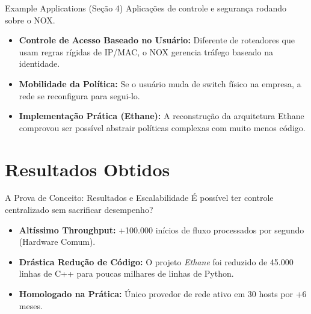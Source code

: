 \documentclass[aspectratio=169,xcolor=dvipsnames]{beamer}
\begin{document}
\begin{frame}{Example Applications (Seção 4)}
    Aplicações de controle e segurança rodando sobre o NOX.
    
    \vspace{0.5cm}
    
    \begin{itemize}            
        \item \textbf{Controle de Acesso Baseado no Usuário:} Diferente de roteadores que usam regras rígidas de IP/MAC, o NOX gerencia tráfego baseado na identidade.
        \item \textbf{Mobilidade da Política:} Se o usuário muda de switch físico na empresa, a rede se reconfigura para segui-lo.
        \item \textbf{Implementação Prática (Ethane):} A reconstrução da arquitetura Ethane comprovou ser possível abstrair políticas complexas com muito menos código.
    \end{itemize}
\end{frame}

\section{Resultados Obtidos}

\begin{frame}{A Prova de Conceito: Resultados e Escalabilidade}
    É possível ter controle centralizado sem sacrificar desempenho?
    
    \vspace{0.5cm}
    
    \begin{itemize}            
        \item \textbf{Altíssimo Throughput:} +100.000 inícios de fluxo processados por segundo (Hardware Comum).
        \item \textbf{Drástica Redução de Código:} O projeto \textit{Ethane} foi reduzido de 45.000 linhas de C++ para poucas milhares de linhas de Python.
        \item \textbf{Homologado na Prática:} Único provedor de rede ativo em 30 hosts por +6 meses.
    \end{itemize}
    
    \vspace{0.3cm}
\end{frame}
\end{document}
